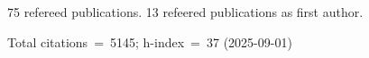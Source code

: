 75 refereed publications. 13 refeered publications as first author.

Total citations~=~5145; h-index~=~37 (2025-09-01)
